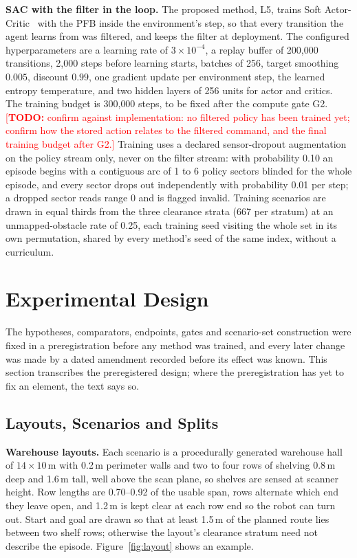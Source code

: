 \documentclass[sensors,article,submit,moreauthors]{Definitions/mdpi}
\newcommand{\todo}[1]{\textcolor{red}{[\textbf{TODO:} #1]}}
\begin{document}
\textbf{SAC with the filter in the loop.} The proposed method, L5, trains Soft Actor-Critic~\citep{haarnoja2018sac} with the PFB inside the environment's step, so that every transition the agent learns from was filtered, and keeps the filter at deployment. The configured hyperparameters are a learning rate of $3\times 10^{-4}$, a replay buffer of 200{,}000 transitions, 2{,}000 steps before learning starts, batches of 256, target smoothing $0.005$, discount $0.99$, one gradient update per environment step, the learned entropy temperature, and two hidden layers of 256 units for actor and critics. The training budget is 300{,}000 steps, to be fixed after the compute gate G2. \todo{confirm against implementation: no filtered policy has been trained yet; confirm how the stored action relates to the filtered command, and the final training budget after G2.} Training uses a declared sensor-dropout augmentation on the policy stream only, never on the filter stream: with probability 0.10 an episode begins with a contiguous arc of 1 to 6 policy sectors blinded for the whole episode, and every sector drops out independently with probability 0.01 per step; a dropped sector reads range 0 and is flagged invalid. Training scenarios are drawn in equal thirds from the three clearance strata (667 per stratum) at an unmapped-obstacle rate of 0.25, each training seed visiting the whole set in its own permutation, shared by every method's seed of the same index, without a curriculum.

\section{Experimental Design}\label{sec:design}

The hypotheses, comparators, endpoints, gates and scenario-set construction were fixed in a preregistration before any method was trained, and every later change was made by a dated amendment recorded before its effect was known. This section transcribes the preregistered design; where the preregistration has yet to fix an element, the text says so.

\subsection{Layouts, Scenarios and Splits}\label{sec:layouts}

\textbf{Warehouse layouts.} Each scenario is a procedurally generated warehouse hall of $14 \times 10$\,m with 0.2\,m perimeter walls and two to four rows of shelving 0.8\,m deep and 1.6\,m tall, well above the scan plane, so shelves are sensed at scanner height. Row lengths are 0.70--0.92 of the usable span, rows alternate which end they leave open, and 1.2\,m is kept clear at each row end so the robot can turn out. Start and goal are drawn so that at least 1.5\,m of the planned route lies between two shelf rows; otherwise the layout's clearance stratum need not describe the episode. Figure~\ref{fig:layout} shows an example.
\end{document}
